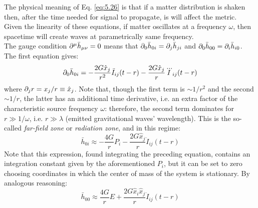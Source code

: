The physical meaning of Eq. \ref{eq:5.26} is that if a matter distribution is shaken then, after the time needed for signal to propagate, is will affect the metric. Given the linearity of these equations, if matter oscillates at a frequency $ \omega $, then spacetime will create waves at parametrically same frequency.\\
The gauge condition $ \partial^\mu \bar{h}_{\mu \nu} = 0 $ means that $ \partial_0 \bar{h}_{0i} = \partial_j \bar{h}_{ji} $ and $ \partial_0 \bar{h}_{00} = \partial_i \bar{h}_{i0} $. The first equation gives:
\begin{equation*}
  \partial_0 \bar{h}_{0i} = - \frac{2G \hat{x}_j}{r^2} \ddot{I}_{ij}(t - r) - \frac{2G \hat{x}_j}{r} \dddot{I}_{ij}(t - r)
\end{equation*}
where $ \partial_j r = x_j / r \equiv \hat{x}_j $. Note that, though the first term is $ \sim 1/r^2 $ and the second $ \sim 1/r $, the latter has an additional time derivative, i.e. an extra factor of the characteristic source frequency $ \omega $: therefore, the second term dominates for $ r \gg 1/\omega $, i.e. $ r \gg \lambda $ (emitted gravitational waves' wavelength). This is the so-called \textit{far-field zone} or \textit{radiation zone}, and in this regime:
\begin{equation}
  \bar{h}_{0i} \approx - \frac{4G}{r} P_i - \frac{2G \hat{x}_j}{r} \ddot{I}_{ij} (t - r)
  \label{eq:5.27}
\end{equation}
Note that this expression, found integrating the preceding equation, contains an integration constant given by the aforementioned $ P_i $, but it can be set to zero choosing coordinates in which the center of mass of the system is stationary. By analogous reasoning:
\begin{equation}
  \bar{h}_{00} \approx \frac{4G}{r} E + \frac{2G \hat{x}_i \hat{x}_j}{r} \ddot{I}_{ij} (t - r)
  \label{eq:5.28}
\end{equation}

